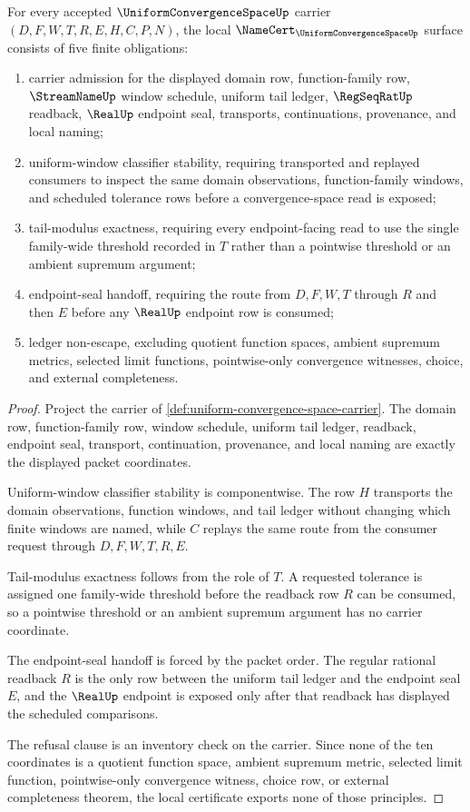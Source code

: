\begin{theorem}\label{thm:uniform-convergence-space-namecert-obligations}
For every accepted $\UniformConvergenceSpaceUp$ carrier $(D,F,W,T,R,E,H,C,P,N)$, the local $\NameCert_{\UniformConvergenceSpaceUp}$ surface consists of five finite obligations:
\begin{enumerate}
\item carrier admission for the displayed domain row, function-family row, $\StreamNameUp$ window schedule, uniform tail ledger, $\RegSeqRatUp$ readback, $\RealUp$ endpoint seal, transports, continuations, provenance, and local naming;
\item uniform-window classifier stability, requiring transported and replayed consumers to inspect the same domain observations, function-family windows, and scheduled tolerance rows before a convergence-space read is exposed;
\item tail-modulus exactness, requiring every endpoint-facing read to use the single family-wide threshold recorded in $T$ rather than a pointwise threshold or an ambient supremum argument;
\item endpoint-seal handoff, requiring the route from $D,F,W,T$ through $R$ and then $E$ before any $\RealUp$ endpoint row is consumed;
\item ledger non-escape, excluding quotient function spaces, ambient supremum metrics, selected limit functions, pointwise-only convergence witnesses, choice, and external completeness.
\end{enumerate}
\end{theorem}
\begin{proof}
Project the carrier of \autoref{def:uniform-convergence-space-carrier}. The domain row, function-family row, window schedule, uniform tail ledger, readback, endpoint seal, transport, continuation, provenance, and local naming are exactly the displayed packet coordinates.

Uniform-window classifier stability is componentwise. The row $H$ transports the domain observations, function windows, and tail ledger without changing which finite windows are named, while $C$ replays the same route from the consumer request through $D,F,W,T,R,E$.

Tail-modulus exactness follows from the role of $T$. A requested tolerance is assigned one family-wide threshold before the readback row $R$ can be consumed, so a pointwise threshold or an ambient supremum argument has no carrier coordinate.

The endpoint-seal handoff is forced by the packet order. The regular rational readback $R$ is the only row between the uniform tail ledger and the endpoint seal $E$, and the $\RealUp$ endpoint is exposed only after that readback has displayed the scheduled comparisons.

The refusal clause is an inventory check on the carrier. Since none of the ten coordinates is a quotient function space, ambient supremum metric, selected limit function, pointwise-only convergence witness, choice row, or external completeness theorem, the local certificate exports none of those principles.
\end{proof}

